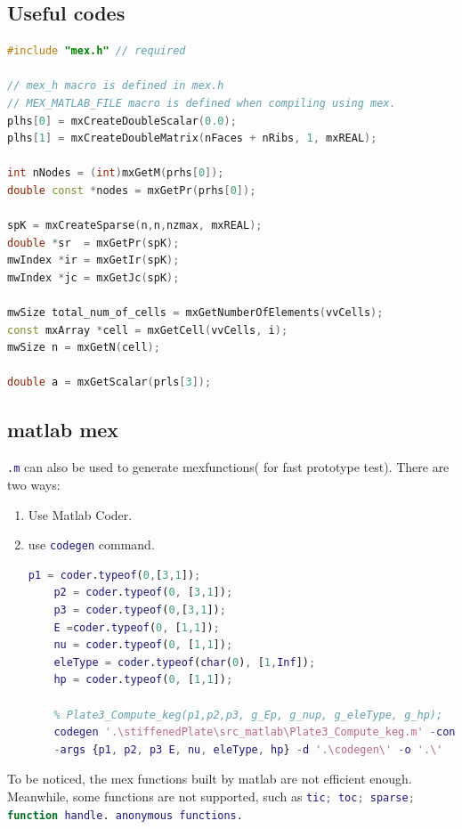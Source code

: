 \documentclass[10pt,a4paper]{article}
\begin{document}
\subsection{Useful codes}
\begin{lstlisting}[language=c++]
#include "mex.h" // required

// mex_h macro is defined in mex.h
// MEX_MATLAB_FILE macro is defined when compiling using mex.
plhs[0] = mxCreateDoubleScalar(0.0);
plhs[1] = mxCreateDoubleMatrix(nFaces + nRibs, 1, mxREAL);

int nNodes = (int)mxGetM(prhs[0]);
double const *nodes = mxGetPr(prhs[0]);

spK = mxCreateSparse(n,n,nzmax, mxREAL);
double *sr  = mxGetPr(spK);
mwIndex *ir = mxGetIr(spK);
mwIndex *jc = mxGetJc(spK);

mwSize total_num_of_cells = mxGetNumberOfElements(vvCells);
const mxArray *cell = mxGetCell(vvCells, i);
mwSize n = mxGetN(cell);

double a = mxGetScalar(prls[3]);
\end{lstlisting}

\subsection{matlab mex}
\lstinline[language=matlab]|.m| can also be used to generate mexfunctions( for fast prototype test). There are two ways:
\begin{enumerate}
	\item Use Matlab Coder.
	\item use \lstinline[language=matlab]|codegen| command.
	\begin{lstlisting}[language=matlab]
	p1 = coder.typeof(0,[3,1]);
	p2 = coder.typeof(0, [3,1]);
	p3 = coder.typeof(0,[3,1]);
	E =coder.typeof(0, [1,1]);
	nu = coder.typeof(0, [1,1]);
	eleType = coder.typeof(char(0), [1,Inf]);
	hp = coder.typeof(0, [1,1]);
	
	% Plate3_Compute_keg(p1,p2,p3, g_Ep, g_nup, g_eleType, g_hp);
	codegen '.\stiffenedPlate\src_matlab\Plate3_Compute_keg.m' -config:mex ...
	-args {p1, p2, p3 E, nu, eleType, hp} -d '.\codegen\' -o '.\'
	\end{lstlisting}
\end{enumerate}

To be noticed, the mex functions built by matlab are not efficient enough. Meanwhile, some functions are not supported, such as \lstinline[language=matlab]|tic; toc; sparse; function handle. anonymous functions.|
\end{document}
